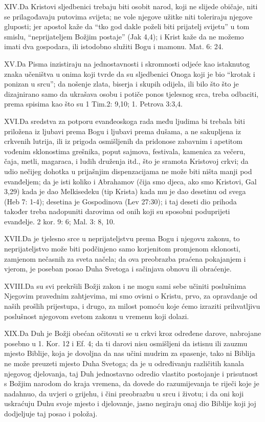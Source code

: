 \lettrine{XIV.} Da Kristovi sljedbenici trebaju biti osobit narod, koji ne slijede običaje, niti se prilagođavaju putovima svijeta; ne vole njegove užitke niti toleriraju njegove gluposti; jer apostol kaže da “tko god dakle poželi biti prijatelj svijetu” u tom smislu, “neprijateljem Božjim postaje” (Jak 4,4); i Krist kaže da ne možemo imati dva gospodara, ili istodobno služiti Bogu i mamonu. Mat. 6: 24.

\lettrine{XV.} Da Pisma inzistiraju na jednostavnosti i skromnosti odjeće kao istaknutog znaka učeništva u onima koji tvrde da su sljedbenici Onoga koji je bio “krotak i ponizan u srcu”; da nošenje zlata, biserja i skupih odijela, ili bilo što što je dizajnirano samo da ukrašava osobu i potiče ponos tjelesnog srca, treba odbaciti, prema spisima kao što su 1 Tim.2: 9,10; 1. Petrova 3:3,4.

\lettrine{XVI.} Da sredstva za potporu evanđeoskoga rada među ljudima bi trebala biti priložena iz ljubavi prema Bogu i ljubavi prema dušama, a ne sakupljena iz crkvenih lutrija, ili iz prigoda osmišljenih da pridonose zabavnim i apetitom vođenim sklonostima grešnika, poput sajmova, festivala, kamenica za večeru, čaja, metli, magaraca, i ludih druženja itd., što je sramota Kristovoj crkvi; da udio nečijeg dohotka u prijašnjim dispenzacijama ne može biti ništa manji pod evanđeljem; da je isti koliko i Abrahamov (čija smo djeca, ako smo Kristovi, Gal 3,29) kada je dao Melkisedeku (tip Krista) kada mu je dao desetinu od svega (Heb 7: 1-4); desetina je Gospodinova (Lev 27:30); i taj deseti dio prihoda također treba nadopuniti darovima od onih koji su sposobni poduprijeti evanđelje. 2 kor. 9: 6; Mal. 3: 8, 10.

\lettrine{XVII.} Da je tjelesno srce u neprijateljstvu prema Bogu i njegovu zakonu, to neprijateljstvo može biti podčinjeno samo korjenitom promjenom sklonosti, zamjenom nečasnih za sveta načela; da ova preobrazba praćena pokajanjem i vjerom, je poseban posao Duha Svetoga i sačinjava obnovu ili obraćenje.

\lettrine{XVIII.} Da su svi prekršili Božji zakon i ne mogu sami sebe učiniti poslušnima Njegovim pravednim zahtjevima, mi smo ovisni o Kristu, prvo, za opravdanje od naših prošlih prijestupa, i drugo, za milost pomoću koje ćemo izraziti prihvatljivu poslušnost njegovom svetom zakonu u vremenu koji dolazi.

\lettrine{XIX.} Da Duh je Božji obećan očitovati se u crkvi kroz određene darove, nabrojane posebno u 1. Kor. 12 i Ef. 4; da ti darovi nisu osmišljeni da istisnu ili zauzmu mjesto Biblije, koja je dovoljna da nas učini mudrim za spasenje, tako ni Biblija ne može preuzeti mjesto Duha Svetoga; da je u određivanju različitih kanala njegovog djelovanja, taj Duh jednostavno odredio vlastito postojanje i prisutnost s Božjim narodom do kraja vremena, da dovede do razumijevanja te riječi koje je nadahnuo, da uvjeri o grijehu, i čini preobrazbu u srcu i životu; i da oni koji uskraćuju Duhu svoje mjesto i djelovanje, jasno negiraju onaj dio Biblije koji joj dodjeljuje taj posao i položaj.

